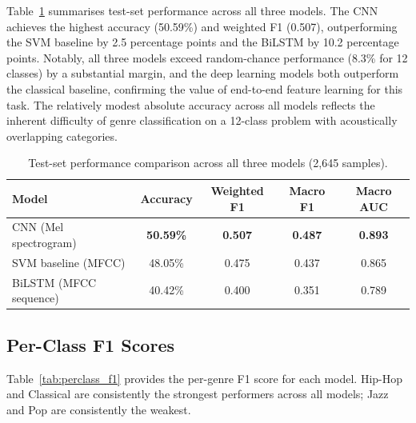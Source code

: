 \documentclass[12pt, a4paper]{article}
\begin{document}
Table~\ref{tab:overall_results} summarises test-set performance across all three models.
The CNN achieves the highest accuracy (50.59\%) and weighted F1 (0.507), outperforming
the SVM baseline by 2.5 percentage points and the BiLSTM by 10.2 percentage points.
Notably, all three models exceed random-chance performance (8.3\% for 12 classes) by a
substantial margin, and the deep learning models both outperform the classical baseline,
confirming the value of end-to-end feature learning for this task. The relatively modest
absolute accuracy across all models reflects the inherent difficulty of genre
classification on a 12-class problem with acoustically overlapping categories.

\begin{table}[h!]
    \centering
    \caption{Test-set performance comparison across all three models (2{,}645 samples).}
    \label{tab:overall_results}
    \begin{tabular}{lcccc}
        \toprule
        \textbf{Model} & \textbf{Accuracy} & \textbf{Weighted F1} & \textbf{Macro F1} & \textbf{Macro AUC} \\
        \midrule
        CNN (Mel spectrogram)   & \textbf{50.59\%} & \textbf{0.507} & \textbf{0.487} & \textbf{0.893} \\
        SVM baseline (MFCC)     & 48.05\%          & 0.475          & 0.437          & 0.865          \\
        BiLSTM (MFCC sequence)  & 40.42\%          & 0.400          & 0.351          & 0.789          \\
        \bottomrule
    \end{tabular}
\end{table}

\subsection{Per-Class F1 Scores}

Table~\ref{tab:perclass_f1} provides the per-genre F1 score for each model. Hip-Hop
and Classical are consistently the strongest performers across all models; Jazz and Pop
are consistently the weakest.
\end{document}
